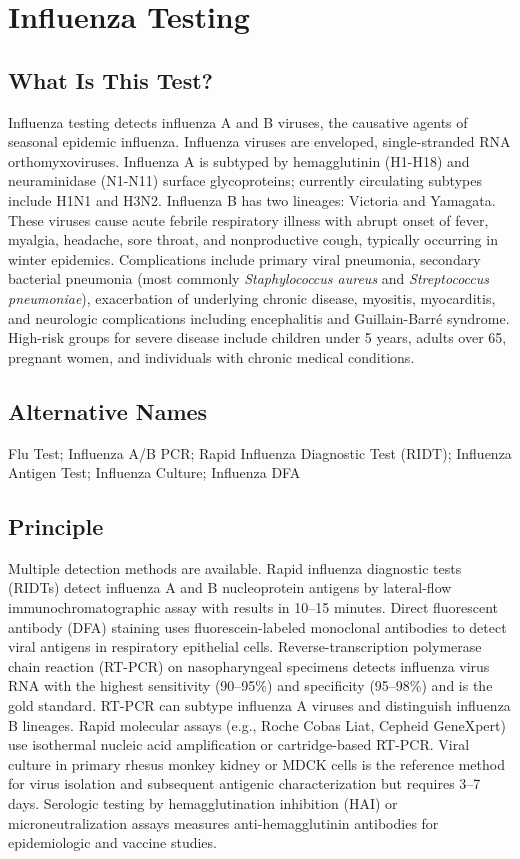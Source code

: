 \chapter{Influenza Testing}

\section*{What Is This Test?}
Influenza testing detects influenza A and B viruses, the causative agents of seasonal epidemic influenza. Influenza viruses are enveloped, single-stranded RNA orthomyxoviruses. Influenza A is subtyped by hemagglutinin (H1-H18) and neuraminidase (N1-N11) surface glycoproteins; currently circulating subtypes include H1N1 and H3N2. Influenza B has two lineages: Victoria and Yamagata. These viruses cause acute febrile respiratory illness with abrupt onset of fever, myalgia, headache, sore throat, and nonproductive cough, typically occurring in winter epidemics. Complications include primary viral pneumonia, secondary bacterial pneumonia (most commonly \textit{Staphylococcus aureus} and \textit{Streptococcus pneumoniae}), exacerbation of underlying chronic disease, myositis, myocarditis, and neurologic complications including encephalitis and Guillain-Barré syndrome. High-risk groups for severe disease include children under 5 years, adults over 65, pregnant women, and individuals with chronic medical conditions.

\section*{Alternative Names}
Flu Test; Influenza A/B PCR; Rapid Influenza Diagnostic Test (RIDT); Influenza Antigen Test; Influenza Culture; Influenza DFA

\section*{Principle}
Multiple detection methods are available. Rapid influenza diagnostic tests (RIDTs) detect influenza A and B nucleoprotein antigens by lateral-flow immunochromatographic assay with results in 10--15 minutes. Direct fluorescent antibody (DFA) staining uses fluorescein-labeled monoclonal antibodies to detect viral antigens in respiratory epithelial cells. Reverse-transcription polymerase chain reaction (RT-PCR) on nasopharyngeal specimens detects influenza virus RNA with the highest sensitivity (90--95\%) and specificity (95--98\%) and is the gold standard. RT-PCR can subtype influenza A viruses and distinguish influenza B lineages. Rapid molecular assays (e.g., Roche Cobas Liat, Cepheid GeneXpert) use isothermal nucleic acid amplification or cartridge-based RT-PCR. Viral culture in primary rhesus monkey kidney or MDCK cells is the reference method for virus isolation and subsequent antigenic characterization but requires 3--7 days. Serologic testing by hemagglutination inhibition (HAI) or microneutralization assays measures anti-hemagglutinin antibodies for epidemiologic and vaccine studies.

